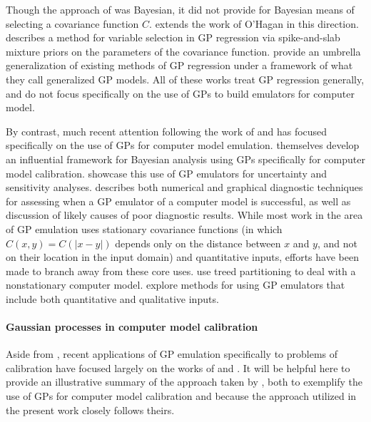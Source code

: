 \documentclass{article}
\begin{document}
Though the approach of \cite{OHagan1978} was Bayesian, it did not provide for Bayesian means of selecting a covariance function $C$. \cite{Neal} extends the work of O'Hagan in this direction. \cite{Savitsky2011} describes a method for variable selection in GP regression via spike-and-slab mixture priors on the parameters of the covariance function. \cite{Shang2013} provide an umbrella generalization of existing methods of GP regression under a framework of what they call generalized GP models. All of these works treat GP regression generally, and do not focus specifically on the use of GPs to build emulators for computer model.

By contrast, much recent attention following the work of \cite{Santner2003a} and \cite{Sacks1989} has focused specifically on the use of GPs for computer model emulation. 
\cite{Kennedy2001} themselves develop an influential framework for Bayesian analysis using GPs specifically for computer model calibration. \cite{Kennedy2006} showcase this use of GP emulators for uncertainty and sensitivity analyses. \cite{Bastos2009} describes both numerical and graphical diagnostic techniques for assessing when a GP emulator of a computer model is successful, as well as discussion of likely causes of poor diagnostic results. While most work in the area of GP emulation uses stationary covariance functions (in which $C(x,y)=C(|x-y|)$ depends only on the distance between $x$ and $y$, and not on their location in the input domain) and quantitative inputs, efforts have been made to branch away from these core uses. \cite{Gramacy2008} use treed partitioning to deal with a nonstationary computer model. \cite{Qian2008} explore methods for using GP emulators that include both quantitative and qualitative inputs.

\paragraph{Gaussian processes in computer model calibration}

Aside from \cite{Kennedy2001}, recent applications of GP emulation specifically to problems of calibration have focused largely on the works of \cite{Williams2006} and \cite{Bayarri2007}. It will be helpful here to provide an illustrative summary of the approach taken by \cite{Williams2006}, both to exemplify the use of GPs for computer model calibration and because the approach utilized in the present work closely follows theirs.
\end{document}
